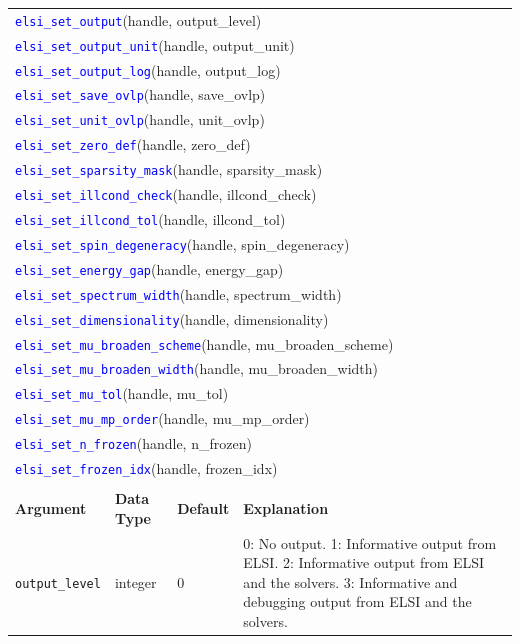 \documentclass{report}
\newcommand{\api}[1]{\textcolor{blue}{\texttt{#1}}}
\begin{document}
\begin{longtable}[]{|p{30mm}|p{20mm}|p{15mm}|p{97mm}|}
\multicolumn{4}{l}{\api{elsi\_set\_output}(handle, output\_level)}\\
\multicolumn{4}{l}{\api{elsi\_set\_output\_unit}(handle, output\_unit)}\\
\multicolumn{4}{l}{\api{elsi\_set\_output\_log}(handle, output\_log)}\\
\multicolumn{4}{l}{\api{elsi\_set\_save\_ovlp}(handle, save\_ovlp)}\\
\multicolumn{4}{l}{\api{elsi\_set\_unit\_ovlp}(handle, unit\_ovlp)}\\
\multicolumn{4}{l}{\api{elsi\_set\_zero\_def}(handle, zero\_def)}\\
\multicolumn{4}{l}{\api{elsi\_set\_sparsity\_mask}(handle, sparsity\_mask)}\\
\multicolumn{4}{l}{\api{elsi\_set\_illcond\_check}(handle, illcond\_check)}\\
\multicolumn{4}{l}{\api{elsi\_set\_illcond\_tol}(handle, illcond\_tol)}\\
\multicolumn{4}{l}{\api{elsi\_set\_spin\_degeneracy}(handle, spin\_degeneracy)}\\
\multicolumn{4}{l}{\api{elsi\_set\_energy\_gap}(handle, energy\_gap)}\\
\multicolumn{4}{l}{\api{elsi\_set\_spectrum\_width}(handle, spectrum\_width)}\\
\multicolumn{4}{l}{\api{elsi\_set\_dimensionality}(handle, dimensionality)}\\
\multicolumn{4}{l}{\api{elsi\_set\_mu\_broaden\_scheme}(handle, mu\_broaden\_scheme)}\\
\multicolumn{4}{l}{\api{elsi\_set\_mu\_broaden\_width}(handle, mu\_broaden\_width)}\\
\multicolumn{4}{l}{\api{elsi\_set\_mu\_tol}(handle, mu\_tol)}\\
\multicolumn{4}{l}{\api{elsi\_set\_mu\_mp\_order}(handle, mu\_mp\_order)}\\
\multicolumn{4}{l}{\api{elsi\_set\_n\_frozen}(handle, n\_frozen)}\\
\multicolumn{4}{l}{\api{elsi\_set\_frozen\_idx}(handle, frozen\_idx)}\\
\multicolumn{4}{l}{}\\
\hline
\multicolumn{1}{|l|}{\textbf{Argument}} & \multicolumn{1}{l|}{\textbf{Data Type}} & \multicolumn{1}{l|}{\textbf{Default}} & \multicolumn{1}{l|}{\textbf{Explanation}}\\
\hline
\texttt{output\_level}       & integer          & 0           & 0: No output. 1: Informative output from ELSI. 2: Informative output from ELSI and the solvers. 3: Informative and debugging output from ELSI and the solvers.\\

\end{longtable}
\end{document}
